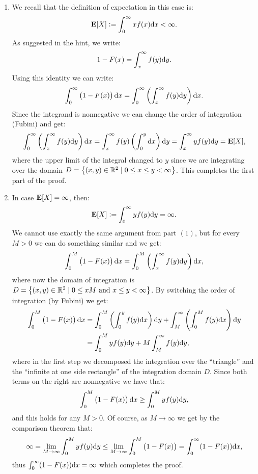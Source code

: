 \documentclass[11pt,a4paper]{article}
\begin{document}
\begin{solution} \phantom{}
  \begin{enumerate}
    \item[(1)] We recall that the definition of expectation in this
      case is:
      \[
        \E[X] := \int_{0}^{\infty} x f(x) \dx < \infty.
      \]
      As suggested in the hint, we write:
      \[
        1 - F(x) = \int_{x}^{\infty} f(y) \dy.
      \]
      Using this identity we can write:
      \[
        \int_{0}^{\infty} \del{1 - F(x)} \dx =
        \int_{0}^{\infty} \del{\int_{x}^{\infty} f(y) \dy} \dx.
      \]
      Since the integrand is nonnegative we can change the order of integration
      (Fubini) and get:
      \[
        \int_{0}^{\infty} \del{\int_{x}^{\infty} f(y) \dy} \dx =
        \int_{x}^{\infty} f(y) \del{\int_{0}^{y} \dx} \dy =
        \int_{x}^{\infty} y f(y) \dy = \E[X],
      \]
      where the upper limit of the integral changed to $y$ since we
      are integrating over the domain
      $D = \left\{(x,y) \in \mathbb{R}^2 \mid 0 \le x \le y < \infty\right\}$.
      This completes the first part of the proof.
    \item[(2)] In case $\mathbf{E}[X] = \infty$, then:
      \[
        \E[X] := \int_{0}^{\infty} y f(y) \dy = \infty.
      \]
      We cannot use exactly the same argument from part $(1)$,
      but for every $M > 0$ we can do something similar and we get:
      \[
        \int_{0}^{M} \del{1 - F(x)} \dx =
        \int_{0}^{M} \del{\int_{x}^{\infty} f(y) \dy} \dx,
      \]
      where now the domain of integration is
      $D = \left\{(x,y) \in \mathbb{R}^2 \mid 0 \le x M \text{ and } x \le y < \infty\right\}$.
      By switching the order of integration (by Fubini) we get:
      \begin{align*}
        \int_{0}^{M} \del{1 - F(x)} \dx &=
        \int_{0}^{M} \del{\int_{0}^{y} f(y) \dx} \dy + 
        \int_{M}^{\infty} \del{\int_{0}^{M} f(y) \dx} \dy \\ &=
        \int_{0}^{M} y f(y) \dy + 
        M \int_{M}^{\infty} f(y) \dy,
      \end{align*}
      where in the first step we decomposed the integration over the ``triangle''
      and the ``infinite at one side rectangle'' of the integration domain $D$.
      Since both terms on the right are nonnegative we have that:
      \[
        \int_{0}^{M} \del{1 - F(x)} \dx \geq
        \int_{0}^{M} y f(y) \dy,
      \]
      and this holds for any $M > 0$.
      Of course, as $M \to \infty$ we get by the comparison theorem that:
      \[
        \infty = \lim_{M \to \infty} \int_{0}^{M} y f(y) \dy \le
        \lim_{M \to \infty} \int_{0}^{M} \del{1 - F(x)} =
        \int_{0}^{\infty} (1 - F(x)) \dx,
      \]
      thus $\int_{0}^{\infty} (1 - F(x)) \dx = \infty$ which completes
      the proof.
  \end{enumerate}
\end{solution}
\end{document}
